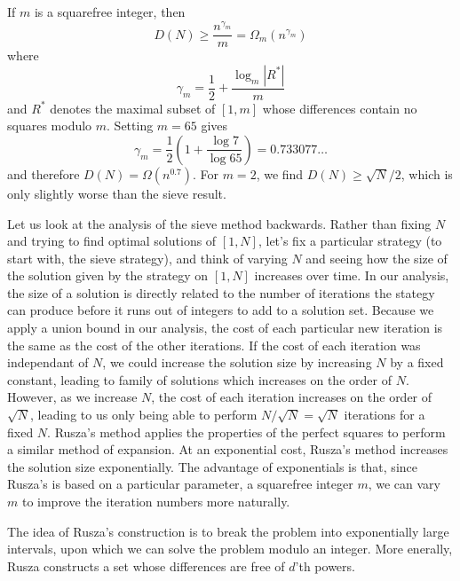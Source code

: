 \begin{theorem}
    If $m$ is a squarefree integer, then
    \[ D(N) \geq \frac{n^{\gamma_m}}{m} = \Omega_m(n^{\gamma_m}) \]
    where
    \[ \gamma_m = \frac{1}{2} + \frac{\log_m |R^*|}{m} \]
    and $R^*$ denotes the maximal subset of $[1,m]$ whose differences contain no squares modulo $m$. Setting $m = 65$ gives
    \[ \gamma_m = \frac{1}{2} \left( 1 + \frac{\log 7}{\log 65} \right) = 0.733077 \dots \]
    and therefore $D(N) = \Omega(n^{0.7})$. For $m = 2$, we find $D(N) \geq \sqrt{N}/2$, which is only slightly worse than the sieve result.
\end{theorem}

\begin{remark}
    Let us look at the analysis of the sieve method backwards. Rather than fixing $N$ and trying to find optimal solutions of $[1,N]$, let's fix a particular strategy (to start with, the sieve strategy), and think of varying $N$ and seeing how the size of the solution given by the strategy on $[1,N]$ increases over time. In our analysis, the size of a solution is directly related to the number of iterations the stategy can produce before it runs out of integers to add to a solution set. Because we apply a union bound in our analysis, the cost of each particular new iteration is the same as the cost of the other iterations. If the cost of each iteration was independant of $N$, we could increase the solution size by increasing $N$ by a fixed constant, leading to family of solutions which increases on the order of $N$. However, as we increase $N$, the cost of each iteration increases on the order of $\sqrt{N}$, leading to us only being able to perform $N/\sqrt{N} = \sqrt{N}$ iterations for a fixed $N$. Rusza's method applies the properties of the perfect squares to perform a similar method of expansion. At an exponential cost, Rusza's method increases the solution size exponentially. The advantage of exponentials is that, since Rusza's is based on a particular parameter, a squarefree integer $m$, we can vary $m$ to improve the iteration numbers more naturally.
\end{remark}

The idea of Rusza's construction is to break the problem into exponentially large intervals, upon which we can solve the problem modulo an integer. More enerally, Rusza constructs a set whose differences are free of $d$'th powers.

